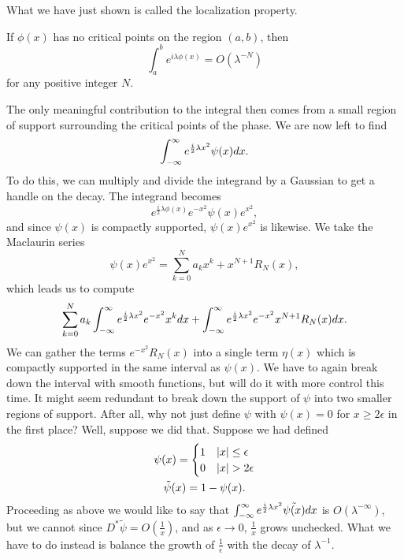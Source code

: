 What we have just shown is called the localization property.
\begin{lemma}[Localization]
	If $\phi(x)$ has no critical points on the region $(a, b)$, then
	\[
	\int_a^b e^{i\lambda\phi(x)} = O (\lambda^{-N})
	\]
	for any positive integer $N$.
	\label{lemma_localization}
\end{lemma}
The only meaningful contribution to the integral then comes from a small region of support surrounding the critical points of the phase. We are now left to find
\[
\int_{-\infty}^\infty e^{\frac{i}{2}\lambda x^2}\psi(x)dx.
\]
To do this, we can multiply and divide the integrand by a Gaussian to get a handle on the decay. The integrand becomes
\[
e^{\frac{i}{2}\lambda\phi(x)}e^{-x^2}\psi(x)e^{x^2},
\]
and since $\psi(x)$ is compactly supported, $\psi(x)e^{x^2}$ is likewise. We take the Maclaurin series
\[
\psi(x)e^{x^2} = \sum_{k=0}^Na_kx^k + x^{N+1}R_N(x),
\]
which leads us to compute
\[
\sum_{k=0}^Na_k \int_{-\infty}^\infty e^{\frac{i}{2}\lambda x^2} e^{-x^2} x^kdx + \int_{-\infty}^\infty  e^{\frac{i}{2}\lambda x^2} e^{-x^2}x^{N+1}R_N(x)dx.
\]
We can gather the terms $e^{-x^2}R_N(x)$ into a single term $\eta(x)$ which is compactly supported in the same interval as $\psi(x)$. We have to again break down the interval with smooth functions, but will do it with more control this time. It might seem redundant to break down the support of $\psi$ into two smaller regions of support. After all, why not just define $\psi$ with $\psi(x) = 0$ for $x \geq 2\epsilon$ in the first place? Well, suppose we did that. Suppose we had defined
\begin{gather}
\psi(x) = \begin{cases}
1 & \lvert x\rvert \leq \epsilon \\
0 & \lvert x\rvert > 2\epsilon \\
\end{cases} \notag\\
\tilde{\psi}(x) = 1 - \psi(x). \notag
\end{gather}
Proceeding as above we would like to say that $\int_{-\infty}^\infty e^{\frac{i}{2}\lambda x^2}\tilde{\psi(x)}dx$ is $O(\lambda^{-\infty})$, but we cannot since $D^*{\tilde{\psi}} = O(\frac{1}{x})$, and as $\epsilon \to 0$, $\frac{1}{x}$ grows unchecked.  What we have to do instead is balance the growth of $\frac{1}{\epsilon}$ with the decay of $\lambda^{-1}$.

